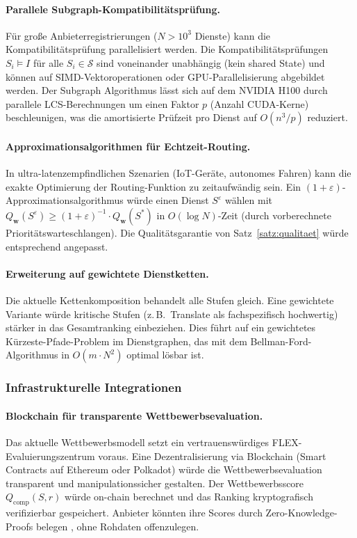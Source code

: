 ﻿\documentclass[a4paper,12pt]{article}
\theoremstyle{definition}
\begin{document}
\paragraph{Parallele Subgraph-Kompatibilitätsprüfung.}
Für große Anbieterregistrierungen ($N > 10^3$ Dienste) kann die Kompatibilitätsprüfung parallelisiert werden. Die Kompatibilitätsprüfungen $S_i \models I$ für alle $S_i \in \mathcal{S}$ sind voneinander unabhängig (kein shared State) und können auf SIMD-Vektoroperationen oder GPU-Parallelisierung abgebildet werden. Der Subgraph Algorithmus lässt sich auf dem NVIDIA H100 durch parallele LCS-Berechnungen um einen Faktor $p$ (Anzahl CUDA-Kerne) beschleunigen, was die amortisierte Prüfzeit pro Dienst auf $O(n^3 / p)$ reduziert.

\paragraph{Approximationsalgorithmen für Echtzeit-Routing.}
In ultra-latenzempfindlichen Szenarien (IoT-Geräte, autonomes Fahren) kann die exakte Optimierung der Routing-Funktion zu zeitaufwändig sein. Ein $(1+\varepsilon)$-Approximationsalgorithmus würde einen Dienst $S^{\varepsilon}$ wählen mit $Q_\mathbf{w}(S^{\varepsilon}) \geq (1+\varepsilon)^{-1} \cdot Q_\mathbf{w}(S^*)$ in $O(\log N)$-Zeit (durch vorberechnete Prioritätswarteschlangen). Die Qualitätsgarantie von Satz~\ref{satz:qualitaet} würde entsprechend angepasst.

\paragraph{Erweiterung auf gewichtete Dienstketten.}
Die aktuelle Kettenkomposition behandelt alle Stufen gleich. Eine gewichtete Variante würde kritische Stufen (z.\,B.\ Translate als fachspezifisch hochwertig) stärker in das Gesamtranking einbeziehen. Dies führt auf ein gewichtetes Kürzeste-Pfade-Problem im Dienstgraphen, das mit dem Bellman-Ford-Algorithmus in $O(m \cdot N^2)$ optimal lösbar ist.

\subsubsection{Infrastrukturelle Integrationen}

\paragraph{Blockchain für transparente Wettbewerbsevaluation.}
Das aktuelle Wettbewerbsmodell setzt ein vertrauenswürdiges FLEX-Evaluierungszentrum voraus. Eine Dezentralisierung via Blockchain (Smart Contracts auf Ethereum oder Polkadot) würde die Wettbewerbsevaluation transparent und manipulationssicher gestalten. Der Wettbewerbsscore $Q_\mathrm{comp}(S, r)$ würde on-chain berechnet und das Ranking kryptografisch verifizierbar gespeichert. Anbieter könnten ihre Scores durch Zero-Knowledge-Proofs belegen \cite{boneh2023}, ohne Rohdaten offenzulegen.
\end{document}
